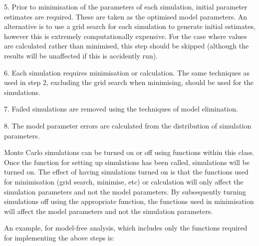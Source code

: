 5.  Prior to minimisation of the parameters of each simulation, initial parameter estimates
are required.  These are taken as the optimised model parameters.  An alternative is to use
a grid search for each simulation to generate initial estimates, however this is extremely
computationally expensive.  For the case where values are calculated rather than minimised,
this step should be skipped (although the results will be unaffected if this is accidently
run).

6.  Each simulation requires minimisation or calculation.  The same techniques as used in
step 2, excluding the grid search when minimising, should be used for the simulations.

7.  Failed simulations are removed using the techniques of model elimination.

8.  The model parameter errors are calculated from the distribution of simulation
parameters.


Monte Carlo simulations can be turned on or off using functions within this class.  Once the
function for setting up simulations has been called, simulations will be turned on.  The
effect of having simulations turned on is that the functions used for minimisation (grid
search, minimise, etc) or calculation will only affect the simulation parameters and not the
model parameters.  By subsequently turning simulations off using the appropriate function,
the functions used in minimisation will affect the model parameters and not the simulation
parameters.


An example, for model-free analysis, which includes only the functions required for
implementing the above steps is:








